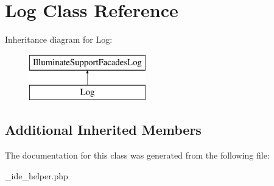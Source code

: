\hypertarget{class_log}{}\section{Log Class Reference}
\label{class_log}
Inheritance diagram for Log\+:\begin{figure}[H]
\begin{center}
\leavevmode
\includegraphics[height=2.000000cm]{class_log}
\end{center}
\end{figure}
\subsection*{Additional Inherited Members}


The documentation for this class was generated from the following file\+:\begin{DoxyCompactItemize}
\item 
\+\_\+ide\+\_\+helper.\+php\end{DoxyCompactItemize}
